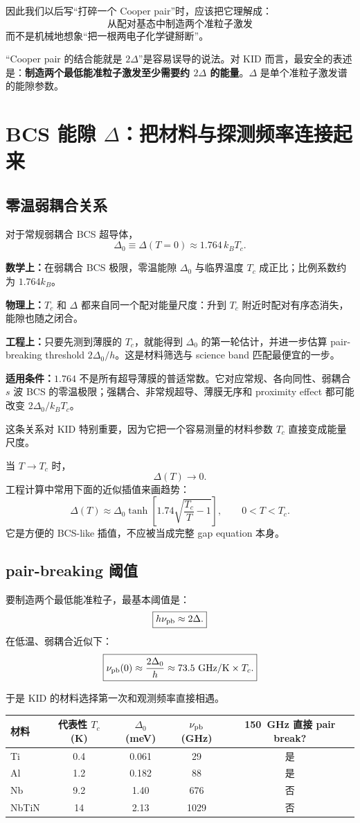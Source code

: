 \documentclass[11pt,a4paper,openany]{ctexrep}
\newcommand{\formulaexplain}[4]{%
\begin{formulaguidebox}
\textbf{\color{KidBlue}数学上：}#1\par
\textbf{\color{KidTeal}物理上：}#2\par
\textbf{\color{KidGold!55!black}工程上：}#3\par
\textbf{\color{KidRed}适用条件：}#4
\end{formulaguidebox}%
}
\begin{document}
因此我们以后写“打碎一个 Cooper pair”时，应该把它理解成：
\[
\boxed{\text{从配对基态中制造两个准粒子激发}}
\]
而不是机械地想象“把一根两电子化学键掰断”。

\begin{mistakebox}
“Cooper pair 的结合能就是 $2\Delta$”是容易误导的说法。对 KID 而言，最安全的表述是：\textbf{制造两个最低能准粒子激发至少需要约 $2\Delta$ 的能量}。$\Delta$ 是单个准粒子激发谱的能隙参数。
\end{mistakebox}

\section{BCS 能隙 $\Delta$：把材料与探测频率连接起来}

\subsection{零温弱耦合关系}
对于常规弱耦合 BCS 超导体，
\[
\boxed{\Delta_0\equiv\Delta(T=0)\approx1.764\,k_B T_c.}
\]
\formulaexplain
{在弱耦合 BCS 极限，零温能隙 $\Delta_0$ 与临界温度 $T_c$ 成正比；比例系数约为 $1.764k_B$。}
{$T_c$ 和 $\Delta$ 都来自同一个配对能量尺度：升到 $T_c$ 附近时配对有序态消失，能隙也随之闭合。}
{只要先测到薄膜的 $T_c$，就能得到 $\Delta_0$ 的第一轮估计，并进一步估算 pair-breaking threshold $2\Delta_0/h$。这是材料筛选与 science band 匹配最便宜的一步。}
{$1.764$ 不是所有超导薄膜的普适常数。它对应常规、各向同性、弱耦合 $s$ 波 BCS 的零温极限；强耦合、非常规超导、薄膜无序和 proximity effect 都可能改变 $2\Delta_0/k_BT_c$。}


这条关系对 KID 特别重要，因为它把一个容易测量的材料参数 $T_c$ 直接变成能量尺度。

当 $T\rightarrow T_c$ 时，
\[
\Delta(T)\rightarrow0.
\]
工程计算中常用下面的近似插值来画趋势：
\[
\Delta(T)\approx
\Delta_0\tanh\!\left[
1.74\sqrt{\frac{T_c}{T}-1}
\right],\qquad 0<T<T_c.
\]
它是方便的 BCS-like 插值，不应被当成完整 gap equation 本身。

\subsection{pair-breaking 阈值}
要制造两个最低能准粒子，最基本阈值是：
\[
\boxed{h\nu_{\rm pb}\approx2\Delta.}
\]
在低温、弱耦合近似下：
\[
\boxed{
\nu_{\rm pb}(0)
\approx
\frac{2\Delta_0}{h}
\approx
73.5\ \mathrm{GHz/K}\times T_c.
}
\]

于是 KID 的材料选择第一次和观测频率直接相遇。

\begin{center}
\renewcommand{\arraystretch}{1.2}
\begin{tabular}{lcccc}
\toprule
材料 & 代表性 $T_c$ (K) & $\Delta_0$ (meV) & $\nu_{\rm pb}$ (GHz) & \SI{150}{GHz} 直接 pair break?\\
\midrule
Ti & 0.4 & 0.061 & 29 & 是 \\
Al & 1.2 & 0.182 & 88 & 是 \\
Nb & 9.2 & 1.40 & 676 & 否 \\
NbTiN & 14 & 2.13 & 1029 & 否 \\
\bottomrule
\end{tabular}
\end{center}
\end{document}
